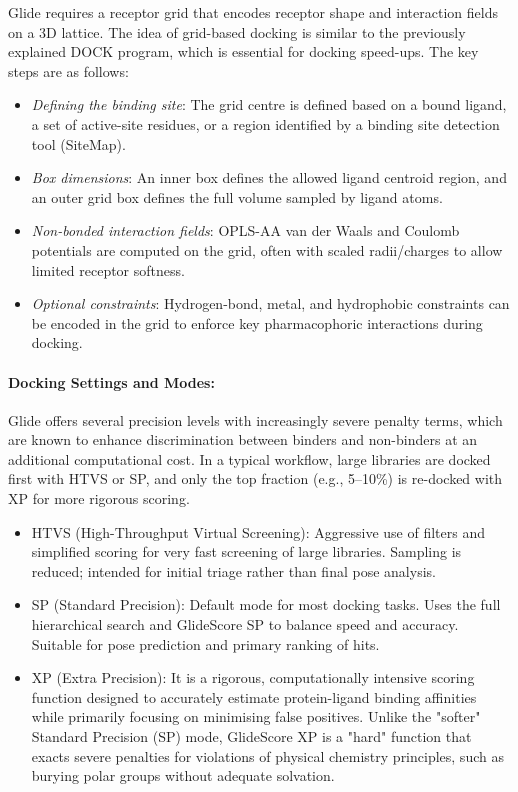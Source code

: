 \documentclass[12pt]{article}
\begin{document}
Glide requires a receptor grid that encodes receptor shape and interaction fields on a 3D lattice. The idea of grid-based docking is similar to the previously explained DOCK program, which is essential for docking speed-ups.
The key steps are as follows:
\begin{itemize}
  \item \emph{Defining the binding site}: The grid centre is defined based on a bound ligand, a set of active-site residues, or a region identified by a binding site detection tool (SiteMap\cite{CH7_sitemap}).
  \item \emph{Box dimensions}: An inner box defines the allowed ligand centroid region, and an outer grid box defines the full volume sampled by ligand atoms.
  \item \emph{Non-bonded interaction fields}: OPLS-AA van der Waals and Coulomb potentials are computed on the grid, often with scaled radii/charges to allow limited receptor softness.
  \item \emph{Optional constraints}: Hydrogen-bond, metal, and hydrophobic constraints can be encoded in the grid to enforce key pharmacophoric interactions during docking.
\end{itemize}

\paragraph{Docking Settings and Modes:}

Glide offers several precision levels with increasingly severe penalty terms, which are known to enhance discrimination between binders and non-binders at an additional computational cost. In a typical workflow, large libraries are docked first with HTVS or SP, and only the top fraction (e.g., 5--10\%) is re-docked with XP for more rigorous scoring.

\begin{itemize}
  \item HTVS (High-Throughput Virtual Screening): Aggressive use of filters and simplified scoring for very fast screening of large libraries. Sampling is reduced; intended for initial triage rather than final pose analysis.
  \item SP (Standard Precision): Default mode for most docking tasks. Uses the full hierarchical search and GlideScore SP to balance speed and accuracy. Suitable for pose prediction and primary ranking of hits\cite{CH7_Friesner2004a,CH7_Friesner2004b}.
  \item XP (Extra Precision): It is a rigorous, computationally intensive scoring function designed to accurately estimate protein-ligand binding affinities while primarily focusing on minimising false positives. Unlike the "softer" Standard Precision (SP) mode, GlideScore XP is a "hard" function that exacts severe penalties for violations of physical chemistry principles, such as burying polar groups without adequate solvation\cite{CH7_Friesner2006}.
\end{itemize}
\end{document}
